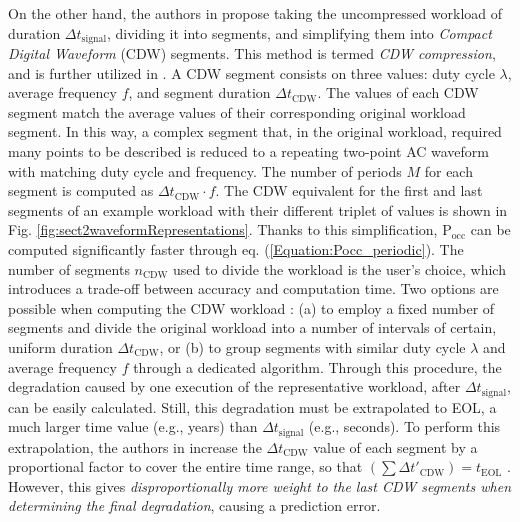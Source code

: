 On the other hand, the authors in \cite{AtomisticPseudoRodopoulos2014} propose taking the uncompressed workload of duration $\Delta t_\text{signal}$, dividing it into segments, and simplifying them into \textit{Compact Digital Waveform} (CDW) segments. This method is termed \textit{CDW compression}, and is further utilized in \cite{duchAnalysisFunctionalErrors2020, fornaciariHarnessingPerformanceVariability2019}. A CDW segment consists on three values: duty cycle $\lambda$, average frequency $f$, and segment duration $\Delta t_{\text{CDW}}$. The values of each CDW segment match the average values of their corresponding original workload segment. In this way, a complex segment that, in the original workload, required many points to be described is reduced to a repeating two-point AC waveform with matching duty cycle and frequency. The number of periods $M$ for each segment is computed as $\Delta t_{\text{CDW}} \cdot f$. The CDW equivalent for the first and last segments of an example workload with their different triplet of values is shown in Fig. \ref{fig:sect2waveformRepresentations}. Thanks to this simplification, $\text{P}_{\text{occ}}$ can be computed significantly faster through eq. (\ref{Equation:Pocc_periodic}). The number of segments $n_\text{CDW}$ used to divide the workload is the user's choice, which introduces a trade-off between accuracy and computation time. Two options are possible when computing the CDW workload \cite{fornaciariHarnessingPerformanceVariability2019}: (a) to employ a fixed number of segments and divide the original workload into a number of intervals of certain, uniform duration $\Delta t_{\text{CDW}}$, or (b) to group segments with similar duty cycle $\lambda$ and average frequency $f$ through a dedicated algorithm.  Through this procedure, the degradation caused by one execution of the representative workload, after $\Delta t_\text{signal}$, can be easily calculated. Still, this degradation must be extrapolated to EOL, a much larger time value (e.g., years) than $\Delta t_\text{signal}$ (e.g., seconds). To perform this extrapolation, the authors in \cite{AtomisticPseudoRodopoulos2014} increase the $\Delta t_{\text{CDW}}$ value of each segment by a proportional factor to cover the entire time range, so that $(\sum{\Delta t'_{\text{CDW}}}) =  t_\text{EOL}$ \cite{AtomisticPseudoRodopoulos2014, fornaciariHarnessingPerformanceVariability2019}. However, this gives \textit{disproportionally more weight to the last CDW segments when determining the final degradation}, causing a prediction error.


